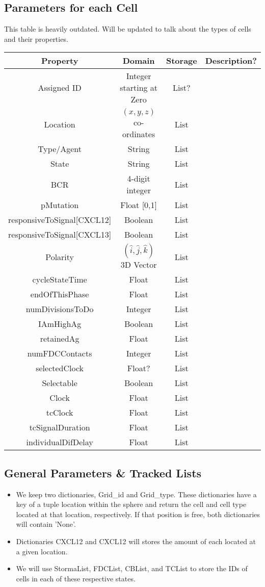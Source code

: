 \documentclass[english]{article}
\begin{document}
\subsection{Parameters for each Cell}
This table is heavily outdated. Will be updated to talk about the types of cells and their properties. 
\begin{center}

\begin{tabular}{|c|c|c|c|}
\hline 
Property & Domain & Storage & Description?\tabularnewline
\hline 
\hline 
Assigned ID & Integer starting at Zero & List? & \tabularnewline
\hline 
Location & $(x,y,z)$ co-ordinates & List & \tabularnewline
\hline
Type/Agent & String & List & \tabularnewline
\hline 
State & String & List & \tabularnewline
\hline 
BCR & 4-digit integer & List & \tabularnewline
\hline 
pMutation & Float [0,1] & List & \tabularnewline
\hline 
responsiveToSignal{[}CXCL12{]} & Boolean & List & \tabularnewline
\hline 
responsiveToSignal{[}CXCL13{]} & Boolean & List & \tabularnewline
\hline 
Polarity & $(\hat{i},\hat{j},\hat{k})$ 3D Vector  & List & \tabularnewline
\hline 
cycleStateTime & Float & List & \tabularnewline
\hline 
endOfThisPhase & Float & List & \tabularnewline
\hline 
numDivisionsToDo & Integer & List & \tabularnewline
\hline 
IAmHighAg & Boolean & List & \tabularnewline
\hline 
retainedAg & Float & List & \tabularnewline
\hline 
numFDCContacts & Integer & List & \tabularnewline
\hline 
selectedClock & Float? & List & \tabularnewline
\hline 
Selectable & Boolean & List & \tabularnewline
\hline 
Clock & Float & List & \tabularnewline
\hline 
tcClock & Float & List & \tabularnewline
\hline 
tcSignalDuration & Float & List & \tabularnewline
\hline 
individualDifDelay & Float & List & \tabularnewline
\hline 
\end{tabular}

\end{center}

\subsection{General Parameters \& Tracked Lists}
\begin{itemize}

\item We keep two dictionaries, Grid\_id and Grid\_type. These dictionaries have a key of a tuple location within the sphere and return the cell and cell type located at that location, respectively. If that position is free, both dictionaries will contain 'None'.

\item Dictionaries CXCL12 and CXCL12 will stores the amount of each located at a given location. 

\item We will use StormaList, FDCList, CBList, and TCList to store the IDs of cells in each of these respective states. 

\end{itemize}
\end{document}
